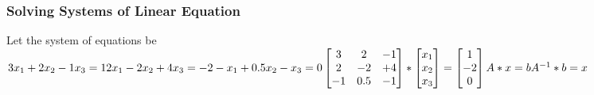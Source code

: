 \documentclass[12pt, right open]{memoir}
\begin{document}


\subsubsection{Solving Systems of Linear Equation}
Let the system of equations be \\
$
3x_1 + 2x_2 -1 x_3 = 1 \\
2x_1 - 2x_2 +4x_3 = -2 \\
-x_1 + 0.5x_2 -x_3 = 0 
\\ \\
\begin{bmatrix}
3 & 2 & -1 \\
2 & -2 & +4 \\
-1 & 0.5 & -1
\end{bmatrix} *
\begin{bmatrix}
x_1 \\
x_2 \\
x_3
\end{bmatrix} =
\begin{bmatrix}
1 \\
-2 \\
0
\end{bmatrix} \\ \\
A * x =b \\
A^{-1} * b = x
$


\end{document}
